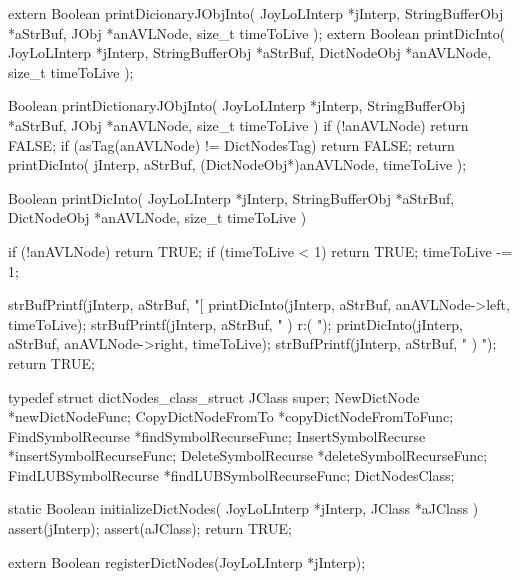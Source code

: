 \startCHeader
extern Boolean printDicionaryJObjInto(
  JoyLoLInterp    *jInterp,
  StringBufferObj *aStrBuf,
  JObj            *anAVLNode,
  size_t           timeToLive
);
extern Boolean printDicInto(
  JoyLoLInterp    *jInterp,
  StringBufferObj *aStrBuf,
  DictNodeObj     *anAVLNode,
  size_t           timeToLive
);
\stopCHeader
{}

\startCCode
Boolean printDictionaryJObjInto(
  JoyLoLInterp    *jInterp,
  StringBufferObj *aStrBuf,
  JObj            *anAVLNode,
  size_t           timeToLive
) {
  if (!anAVLNode) return FALSE;
  if (asTag(anAVLNode) != DictNodesTag) return FALSE;
  return printDicInto(
    jInterp,
    aStrBuf,
    (DictNodeObj*)anAVLNode,
    timeToLive
  );
}

Boolean printDicInto(
  JoyLoLInterp    *jInterp,
  StringBufferObj *aStrBuf,
  DictNodeObj     *anAVLNode,
  size_t           timeToLive
) {
  if (!anAVLNode) return TRUE;
  if (timeToLive < 1) return TRUE;
  timeToLive -= 1;
  
  strBufPrintf(jInterp, aStrBuf, "[%
  printDicInto(jInterp, aStrBuf, anAVLNode->left, timeToLive);
  strBufPrintf(jInterp, aStrBuf, " ) r:( ");
  printDicInto(jInterp, aStrBuf, anAVLNode->right, timeToLive);
  strBufPrintf(jInterp, aStrBuf, " ) ");
  return TRUE;
}
\stopCCode

\startTestSuite[registerDictNodes]

\startCHeader
typedef struct dictNodes_class_struct {
  JClass super;
  NewDictNode          *newDictNodeFunc;
  CopyDictNodeFromTo   *copyDictNodeFromToFunc;
  FindSymbolRecurse    *findSymbolRecurseFunc;
  InsertSymbolRecurse  *insertSymbolRecurseFunc;
  DeleteSymbolRecurse  *deleteSymbolRecurseFunc;
  FindLUBSymbolRecurse *findLUBSymbolRecurseFunc;
} DictNodesClass;
\stopCHeader

\startCCode
static Boolean initializeDictNodes(
  JoyLoLInterp *jInterp,
  JClass   *aJClass
) {
  assert(jInterp);
  assert(aJClass);
  return TRUE;
}
\stopCCode

\startCHeader
extern Boolean registerDictNodes(JoyLoLInterp *jInterp);
\stopCHeader
{}

